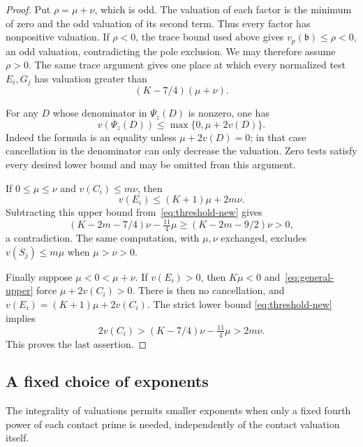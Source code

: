 \documentclass[11pt,a4paper]{article}
\begin{document}
\begin{proof}
Put $\rho=\mu+\nu$, which is odd. The valuation of each factor is
the minimum of zero and the odd valuation of its second term. Thus
every factor has nonpositive valuation. If $\rho<0$, the trace bound
used above gives $v_p(\mathfrak b)\le\rho<0$, an odd valuation,
contradicting the pole exclusion. We may therefore assume $\rho>0$.
The same trace argument gives one place at which every normalized
test $E_i,G_j$ has valuation greater than
\begin{equation}\label{eq:threshold-new}
                         (K-7/4)(\mu+\nu).
\end{equation}

For any $D$ whose denominator in $\Psi_z(D)$ is nonzero, one has
\begin{equation}\label{eq:general-upper}
 v(\Psi_z(D))\le\max\{0,\mu+2v(D)\}.
\end{equation}
Indeed the formula is an equality unless $\mu+2v(D)=0$;
in that case cancellation in the denominator can only decrease
the valuation. Zero tests satisfy every desired lower bound and
may be omitted from this argument.

If $0\le\mu\le\nu$ and $v(C_i)\le m\nu$, then
\[
              v(E_i)\le(K+1)\mu+2m\nu.
\]
Subtracting this upper bound from~\eqref{eq:threshold-new} gives
\[
 (K-2m-7/4)\nu-\tfrac{11}{4}\mu
          \ge(K-2m-9/2)\nu>0,
\]
a contradiction. The same computation, with $\mu,\nu$ exchanged,
excludes $v(S_j)\le m\mu$ when $\mu>\nu>0$.

Finally suppose $\mu<0<\mu+\nu$. If $v(E_i)>0$, then
$K\mu<0$ and~\eqref{eq:general-upper} force
$\mu+2v(C_i)>0$. There is then no cancellation, and
$v(E_i)=(K+1)\mu+2v(C_i)$. The strict lower bound
\eqref{eq:threshold-new} implies
\[
 2v(C_i)>(K-7/4)\nu-\tfrac{11}{4}\mu>2m\nu.
\]
This proves the last assertion.
\end{proof}

\subsection{A fixed choice of exponents}

The integrality of valuations permits smaller exponents when only a
fixed fourth power of each contact prime is needed, independently of
the contact valuation itself.
\end{document}
